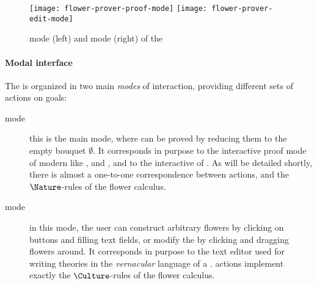\begin{scope}
\begin{figure*}
  \texttt{[image: flower-prover-proof-mode]}
  \hspace{1em}
  \texttt{[image: flower-prover-edit-mode]}
  \caption{\Proof mode (left) and \Edit mode (right) of the }
\end{figure*}

\paragraph{Modal interface}

The  is organized in two main \emph{modes} of interaction,
providing different sets of  actions on
goals:
\begin{description}
  \item[\Proof mode] this is the main mode, where  can be proved by
  reducing them to the empty bouquet $\emptyset$. It corresponds in purpose to
  the interactive proof mode of modern  like ,  and
  , and to the interactive  of .
  As will be detailed shortly, there is almost a one-to-one correspondence
  between \Proof actions, and the $\Nature$-rules of the flower calculus.
  
  \item[\Edit mode] in this mode, the user can construct arbitrary
  flowers by clicking on buttons and filling text fields, or modify the  by
  clicking and dragging flowers around. It corresponds in purpose to the text
  editor used for writing theories in the \emph{vernacular} language of a . \Edit actions implement exactly the
  $\Culture$-rules of the flower calculus.
\end{description}


\end{scope}
